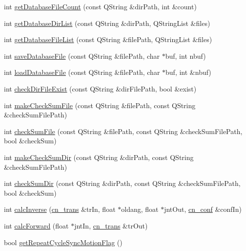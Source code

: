 \begin{DoxyCompactItemize}
\item 
int \hyperlink{classCNRobo_a85adf534a3286c43bcc2982acb30dba3}{get\-Database\-File\-Count} (const Q\-String \&dir\-Path, int \&count)
\item 
int \hyperlink{classCNRobo_a9d8152d370c0a6bbcf74db784efc422f}{get\-Database\-Dir\-List} (const Q\-String \&dir\-Path, Q\-String\-List \&files)
\item 
int \hyperlink{classCNRobo_abb9ab347ee4f65898c6b6e5edece7605}{get\-Database\-File\-List} (const Q\-String \&file\-Path, Q\-String\-List \&files)
\item 
int \hyperlink{classCNRobo_a7c3010e5ace8917a82e9f9befc300390}{save\-Database\-File} (const Q\-String \&file\-Path, char $\ast$buf, int nbuf)
\item 
int \hyperlink{classCNRobo_a5a611d64e88346ca29dba547a0bd8be5}{load\-Database\-File} (const Q\-String \&file\-Path, char $\ast$buf, int \&nbuf)
\item 
int \hyperlink{classCNRobo_adf4a97b7043287ce4c7cef680fc92a9f}{check\-Dir\-File\-Exist} (const Q\-String \&dir\-File\-Path, bool \&exist)
\item 
int \hyperlink{classCNRobo_a99f782e0080ff1fc8c8dd3d21d5f8f8b}{make\-Check\-Sum\-File} (const Q\-String \&file\-Path, const Q\-String \&check\-Sum\-File\-Path)
\item 
int \hyperlink{classCNRobo_addf77c2d9f07cd013f948a711147c517}{check\-Sum\-File} (const Q\-String \&file\-Path, const Q\-String \&check\-Sum\-File\-Path, bool \&check\-Sum)
\item 
int \hyperlink{classCNRobo_aba77858b651565654fcd84592c4cddc3}{make\-Check\-Sum\-Dir} (const Q\-String \&dir\-Path, const Q\-String \&check\-Sum\-File\-Path)
\item 
int \hyperlink{classCNRobo_a810bc8836f767c26b49752792eeb0eca}{check\-Sum\-Dir} (const Q\-String \&dir\-Path, const Q\-String \&check\-Sum\-File\-Path, bool \&check\-Sum)
\item 
int \hyperlink{classCNRobo_a24285ca0e331a56a56962e3fc170002a}{calc\-Inverse} (\hyperlink{structcn__trans}{cn\-\_\-trans} \&tr\-In, float $\ast$oldang, float $\ast$jnt\-Out, \hyperlink{structcn__conf}{cn\-\_\-conf} \&conf\-In)
\item 
int \hyperlink{classCNRobo_ad438a308cde26b09a321dfb42a7a9817}{calc\-Forward} (float $\ast$jnt\-In, \hyperlink{structcn__trans}{cn\-\_\-trans} \&tr\-Out)
\item 
bool \hyperlink{classCNRobo_a880e16945c648133971b3f9af4250b1c}{get\-Repeat\-Cycle\-Sync\-Motion\-Flag} ()
\item 

\end{DoxyCompactItemize}
